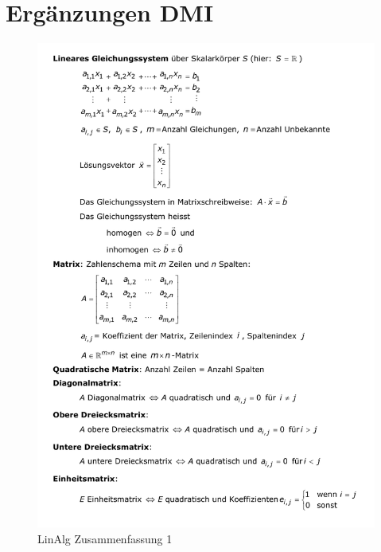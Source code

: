 \documentclass[../Main.tex]{subfiles}
\begin{document}
\section{Ergänzungen DMI}
\begin{figure}[H]
    \centering
    \includegraphics[width=0.75\linewidth]{Images/dmi_1.png}
    \caption{LinAlg Zusammenfassung 1}
\end{figure}
\end{document}
